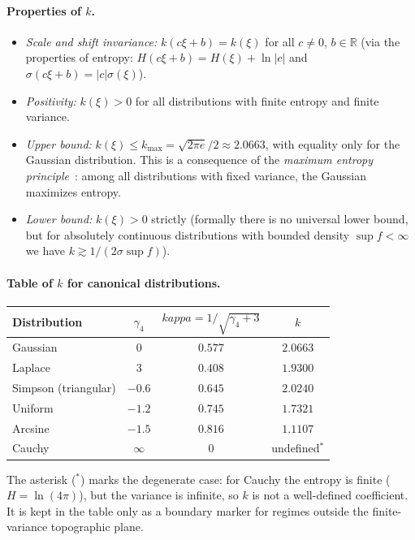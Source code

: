 \documentclass[11pt]{article}
\def\varkappa{kappa}%
\theoremstyle{definition}
\begin{document}
\paragraph{Properties of $k$.}
\begin{itemize}
  \item \emph{Scale and shift invariance:}
        $k(c\xi + b) = k(\xi)$ for all $c \neq 0$, $b \in \mathbb{R}$
        (via the properties of entropy: $H(c\xi+b) = H(\xi) + \ln|c|$ and
        $\sigma(c\xi+b) = |c|\sigma(\xi)$).
  \item \emph{Positivity:} $k(\xi) > 0$ for all distributions with finite
        entropy and finite variance.
  \item \emph{Upper bound:} $k(\xi) \leq k_{\max} = \sqrt{2\pi e}/2 \approx 2.0663$,
        with equality only for the Gaussian distribution. This is a
        consequence of the \emph{maximum entropy
        principle}~\citep[ch.~12.4]{coverthomas2006}: among all distributions
        with fixed variance, the Gaussian maximizes entropy.
  \item \emph{Lower bound:} $k(\xi) > 0$ strictly (formally there is no
        universal lower bound, but for absolutely continuous distributions
        with bounded density $\sup f < \infty$ we have
        $k \gtrsim 1/(2\sigma \sup f)$).
\end{itemize}

\paragraph{Table of $k$ for canonical distributions.}
\begin{center}
\begin{tabular}{l|c|c|c}
Distribution & $\gamma_4$ & $\varkappa = 1/\sqrt{\gamma_4 + 3}$ & $k$ \\
\hline
Gaussian            & $0$      & $0.577$ & $2.0663$ \\
Laplace             & $3$      & $0.408$ & $1.9300$ \\
Simpson (triangular)& $-0.6$   & $0.645$ & $2.0240$ \\
Uniform             & $-1.2$   & $0.745$ & $1.7321$ \\
Arcsine             & $-1.5$   & $0.816$ & $1.1107$ \\
Cauchy              & $\infty$ & $0$     & undefined$^{*}$  \\
\end{tabular}
\end{center}
The asterisk ($^{*}$) marks the degenerate case: for Cauchy the entropy is
finite ($H = \ln(4\pi)$), but the variance is infinite, so $k$ is not a
well-defined coefficient. It is kept in the table only as a boundary marker
for regimes outside the finite-variance topographic plane.
\end{document}
